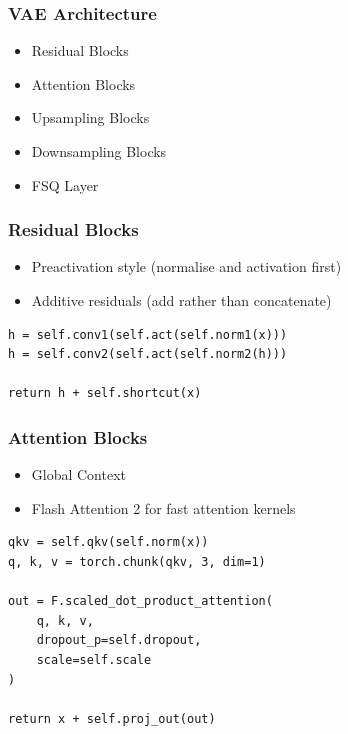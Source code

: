 \documentclass{beamer}
\begin{document}
\begin{frame}
    \frametitle{VAE Architecture}
    \begin{itemize}
        \setlength{\itemsep}{1em}
        \item Residual Blocks
        \item Attention Blocks
        \item Upsampling Blocks
        \item Downsampling Blocks
        \item FSQ Layer
    \end{itemize}
\end{frame}

\begin{frame}[fragile]
    \frametitle{Residual Blocks}
    \begin{itemize}
        \setlength{\itemsep}{1em}
        \item Preactivation style (normalise and activation first)
        \item Additive residuals (add rather than concatenate)
    \end{itemize}

\begin{center}
\begin{lstlisting}
h = self.conv1(self.act(self.norm1(x)))
h = self.conv2(self.act(self.norm2(h)))

return h + self.shortcut(x)
\end{lstlisting}
\end{center}
\end{frame}

\begin{frame}[fragile]
    \frametitle{Attention Blocks}
    \begin{itemize}
        \setlength{\itemsep}{1em}
        \item Global Context
        \item Flash Attention 2 for fast attention kernels
    \end{itemize}

    \begin{center}
\begin{lstlisting}
qkv = self.qkv(self.norm(x))
q, k, v = torch.chunk(qkv, 3, dim=1)

out = F.scaled_dot_product_attention(
    q, k, v, 
    dropout_p=self.dropout, 
    scale=self.scale
)

return x + self.proj_out(out)
\end{lstlisting}
    \end{center}
\end{frame}
\end{document}
